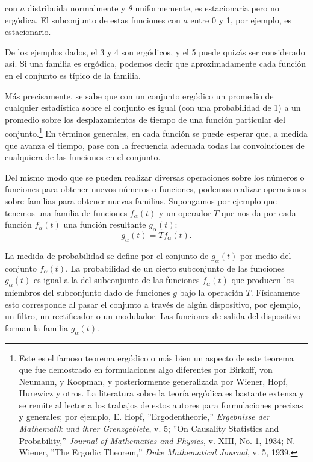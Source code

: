 con $a$ distribuida normalmente y $\theta$ uniformemente, es estacionaria pero
no erg\'odica. El subconjunto de estas funciones con $a$ entre 0 y 1, por
ejemplo, es estacionario.

De los ejemplos dados, el 3 y 4 son erg\'odicos, y el 5 puede quiz\'as ser
considerado as\'i. Si una familia es erg\'odica, podemos decir que
aproximadamente cada funci\'on en el conjunto es t\'ipico de la familia.

M\'as precisamente, se sabe que con un conjunto erg\'odico un promedio de
cualquier estad\'istica sobre el conjunto es igual (con una probabilidad de 1)
a un promedio sobre los desplazamientos de tiempo de una funci\'on particular
del conjunto.\footnote[3]{Este es el famoso teorema erg\'odico o m\'as bien un
aspecto de este teorema que fue demostrado en formulaciones algo diferentes por
Birkoff, von Neumann, y Koopman, y posteriormente generalizada por Wiener, Hopf,
Hurewicz y otros. La literatura sobre la teor\'ia erg\'odica es bastante extensa
y se remite al lector a los trabajos de estos autores para formulaciones
precisas y generales; por ejemplo, E. Hopf, ''Ergodentheorie,'' {\em Ergebnisse
der Mathematik und ihrer Grenzgebiete}, v. 5; ''On Causality Statistics and
Probability,'' {\em Journal of Mathematics and Physics}, v. XIII, No. 1, 1934;
N. Wiener, ''The Ergodic Theorem,'' {\em Duke Mathematical Journal}, v. 5,
1939.} En t\'erminos generales, en cada funci\'on se puede esperar que, a medida
que avanza el tiempo, pase con la frecuencia adecuada todas las convoluciones de
cualquiera de las funciones en el conjunto.


Del mismo modo que se pueden realizar diversas operaciones sobre los n\'umeros o
funciones para obtener nuevos n\'umeros o funciones, podemos realizar
operaciones sobre familias para obtener nuevas familias. Supongamos por ejemplo
que tenemos una familia de funciones $f_{\alpha}(t)$ y un operador $T$ que nos
da por cada funci\'on $f_{\alpha}(t)$ una funci\'on resultante $g_{\alpha}(t)$:
\begin{equation}
  g_{\alpha}(t) = Tf_{\alpha}(t).
\end{equation}

La medida de probabilidad se define por el conjunto de $g_{\alpha}(t)$ por
medio del conjunto $f_{\alpha}(t)$. La probabilidad de un cierto subconjunto de
las funciones $g_{\alpha}(t)$ es igual a la del subconjunto de las funciones
$f_{\alpha}(t)$ que producen los miembros del subconjunto dado de funciones $g$
bajo la operaci\'on $T$. F\'isicamente esto corresponde al pasar el conjunto a
trav\'es de alg\'un dispositivo, por ejemplo, un filtro, un rectificador o un
modulador. Las funciones de salida del dispositivo forman la familia
$g_{\alpha}(t)$.

